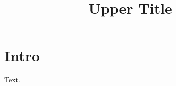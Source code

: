 \documentclass{article}
\title{Upper Title}
\begin{document}
\begin{center}{\Large \MakeUppercase{\@title}\par}\end{center}
\begin{center}{\Large \uppercase\expandafter{\@title}\par}\end{center}
\section{Intro}
Text.
\end{document}
